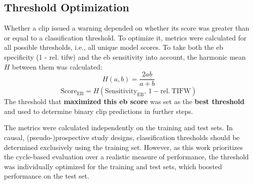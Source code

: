 \subsection{Threshold Optimization} \label{subsec:threshold-optimization}
Whether a clip issued a warning depended on whether its score was greater than or equal to a classification threshold.
To optimize it, metrics were calculated for all possible thresholds, i.e., all unique model scores.
To take both the \gls{eb} specificity (1 - rel. \gls{tifw}) and the \gls{eb} sensitivity into account, the harmonic mean $H$ between them was calculated:
\begin{equation} \label{eq:harmonic-mean}
    H(a,b)=\frac{2ab}{a+b}
\end{equation}
\begin{equation} \label{eq:eb-score}
    \mathrm{Score}_{\mathrm{EB}} = H\!\left(\mathrm{Sensitivity}_{\mathrm{EB}},\, 1-\mathrm{rel.\ TIFW}\right)
\end{equation}
The threshold that \textbf{maximized this \gls{eb} score} was set as the \textbf{best threshold} and used to determine binary clip predictions in further steps.

The metrics were calculated independently on the training and test sets.
In causal, \mbox{(pseudo-)prospective} study designs, classification thresholds should be determined exclusively using the training set.
However, as this work prioritizes the cycle-based evaluation over a realistic measure of performance, the threshold was individually optimized for the training and test sets, which boosted performance on the test set.
